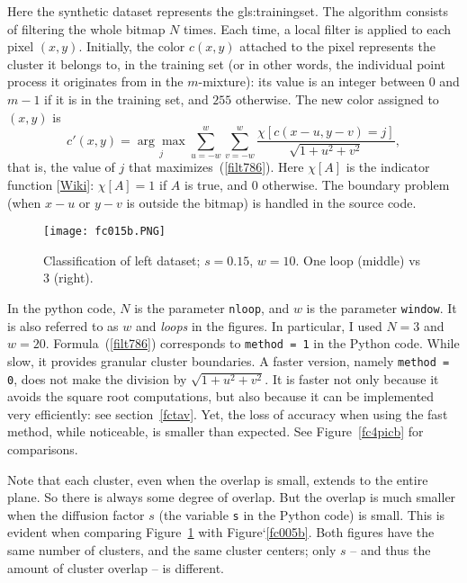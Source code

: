 \documentclass[oneside,10pt]{book}
\begin{document}
Here the synthetic dataset represents the \gls{gls:trainingset}. The algorithm consists of filtering the whole  bitmap $N$ times.
Each time, a local filter is applied
to each pixel $(x,y)$. Initially, the color $c(x,y)$ attached to the pixel represents the cluster it belongs to, in the training set (or in other words, the individual point process it originates from in the $m$-mixture): its value
is an integer between $0$ and $m-1$ if it is in the training set, and $255$ otherwise.  The new color assigned to $(x,y)$ is
\begin{equation}
c'(x,y)=\underset{j}{\arg \max} \sum_{u=-w}^{w}\sum_{v=-w}^{w}\frac{\chi[c(x-u,y-v)=j]}{\sqrt{1+u^2+v^2}}, \label{filt786}
\end{equation}
that is, the value of $j$ that maximizes~(\ref{filt786}). Here $\chi[A]$ is the indicator function [\href{https://en.wikipedia.org/wiki/Indicator_function}{Wiki}]: $\chi[A]=1$ if $A$ is true, and $0$ otherwise.
The boundary problem (when $x-u$ or $y-v$ is outside the bitmap) is handled in the source code.

\begin{figure}[H]
\centering
\texttt{[image: fc015b.PNG]}
\caption{Classification of left dataset; $s=0.15$, $w=10$. One loop (middle) vs $3$ (right).}
\label{fc015b}
\end{figure}

In the python code, $N$ is the parameter \texttt{nloop}, and $w$ is the parameter
\texttt{window}. It is also referred to as $w$ and {\em loops} in the figures. In particular, I used $N=3$ and $w=20$. Formula~(\ref{filt786}) corresponds
to \texttt{method = 1} in the Python code. While slow, it provides granular cluster boundaries. A faster version, namely \texttt{method = 0}, does not make the division by
$\sqrt{1+u^2+v^2}$. It is faster not only because it avoids the square root computations, but also because it can be implemented very efficiently:
see section~\ref{fctav}. Yet, the loss of accuracy when using the fast method, while noticeable, is smaller than expected.  See Figure~\ref{fc4picb} for comparisons.

Note that each cluster, even when the overlap is small, extends to the entire plane. So there is always some degree of overlap. But the overlap is much smaller when the diffusion
factor $s$ (the variable \texttt{s} in the Python code) is small. This is evident when comparing Figure~\ref{fc015b} with Figure`\ref{fc005b}. Both figures have the same number
of clusters, and the same cluster centers; only $s$ -- and thus the amount of cluster overlap -- is different.
\end{document}
